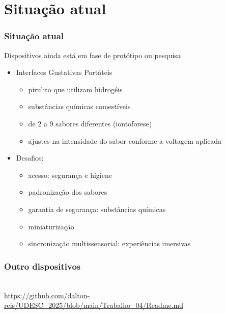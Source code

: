 \documentclass{beamer}
\begin{document}

\section{Situação atual}
\begin{frame}
  \frametitle{Situação atual}
  Dispositivos ainda está em fase de protótipo ou pesquisa \\
  \begin{itemize}
    \item Interfaces Gustativas Portáteis
    \begin{itemize}
      \item pirulito que utilizam hidrogéis
      \item substâncias químicas comestíveis
      \item de 2 a 9 sabores diferentes (iontoforese)
      \item ajustes na intensidade do sabor conforme a voltagem aplicada
    \end{itemize}
    \item Desafios:
    \begin{itemize}
      \item acesso: segurança e higiene
      \item padronização dos sabores
      \item garantia de segurança: substâncias químicas
      \item miniaturização
      \item sincronização multissensorial: experiências imersivas
    \end{itemize}
  \end{itemize}
\end{frame}

\begin{frame}
  \frametitle{Outro dispositivos}
  \begin{flushright}
    \cite{reisTrabalho4Interfaces2025} \\
    \url{https://github.com/dalton-reis/UDESC_2025/blob/main/Trabalho_04/Readme.md}
  \end{flushright}
\end{frame}
\end{document}
